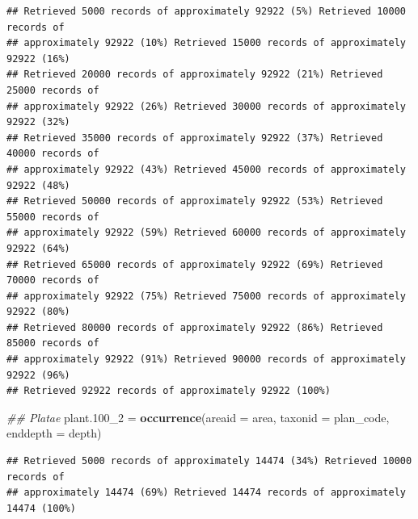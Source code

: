 \documentclass[12pt,]{article}
\newenvironment{Shaded}{\begin{snugshade}}{\end{snugshade}}
\newcommand{\CommentTok}[1]{\textcolor[rgb]{0.56,0.35,0.01}{\textit{#1}}}
\newcommand{\DataTypeTok}[1]{\textcolor[rgb]{0.13,0.29,0.53}{#1}}
\newcommand{\DecValTok}[1]{\textcolor[rgb]{0.00,0.00,0.81}{#1}}
\newcommand{\FloatTok}[1]{\textcolor[rgb]{0.00,0.00,0.81}{#1}}
\newcommand{\KeywordTok}[1]{\textcolor[rgb]{0.13,0.29,0.53}{\textbf{#1}}}
\newcommand{\NormalTok}[1]{#1}
\newcommand{\StringTok}[1]{\textcolor[rgb]{0.31,0.60,0.02}{#1}}
\begin{document}
\begin{verbatim}
## Retrieved 5000 records of approximately 92922 (5%) Retrieved 10000 records of
## approximately 92922 (10%) Retrieved 15000 records of approximately 92922 (16%)
## Retrieved 20000 records of approximately 92922 (21%) Retrieved 25000 records of
## approximately 92922 (26%) Retrieved 30000 records of approximately 92922 (32%)
## Retrieved 35000 records of approximately 92922 (37%) Retrieved 40000 records of
## approximately 92922 (43%) Retrieved 45000 records of approximately 92922 (48%)
## Retrieved 50000 records of approximately 92922 (53%) Retrieved 55000 records of
## approximately 92922 (59%) Retrieved 60000 records of approximately 92922 (64%)
## Retrieved 65000 records of approximately 92922 (69%) Retrieved 70000 records of
## approximately 92922 (75%) Retrieved 75000 records of approximately 92922 (80%)
## Retrieved 80000 records of approximately 92922 (86%) Retrieved 85000 records of
## approximately 92922 (91%) Retrieved 90000 records of approximately 92922 (96%)
## Retrieved 92922 records of approximately 92922 (100%)
\end{verbatim}

\begin{Shaded}
\begin{Highlighting}[]
\CommentTok{## Platae}
\NormalTok{plant}\FloatTok{.100}\NormalTok{_}\DecValTok{2}\NormalTok{ =}\StringTok{ }\KeywordTok{occurrence}\NormalTok{(}\DataTypeTok{areaid =}\NormalTok{ area, }\DataTypeTok{taxonid =}\NormalTok{ plan_code, }\DataTypeTok{enddepth =}\NormalTok{ depth)}
\end{Highlighting}
\end{Shaded}

\begin{verbatim}
## Retrieved 5000 records of approximately 14474 (34%) Retrieved 10000 records of
## approximately 14474 (69%) Retrieved 14474 records of approximately 14474 (100%)
\end{verbatim}
\end{document}
